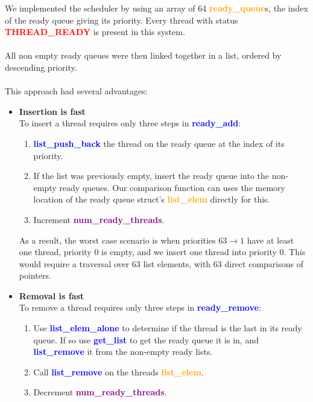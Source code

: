 \documentclass{report}
\newcommand{\bullpara}[2]{\item \textbf{#1} \ #2}
\newcommand{\fun}[1]{\textcolor{blue}{\textbf{#1}}}
\newcommand{\struct}[1]{\textcolor{orange}{\textbf{#1}}}
\newcommand{\var}[1]{\textcolor{purple}{\textbf{#1}}}
\newcommand{\const}[1]{\textcolor{red}{\textbf{#1}}}
\begin{document}
                We implemented the scheduler by using an array of 64 \struct{ready\_queue}s, the index of the ready queue giving its priority. Every thread with status \const{THREAD\_READY} is present in this system.
                \\
                \\ All non empty ready queues were then linked together in a list, ordered by descending priority.
                \\
                \\ This approach had several advantages:
                \begin{itemize}
                    \bullpara{Insertion is fast}{
                        \\ To insert a thread requires only three steps in \fun{ready\_add}:
                        \begin{enumerate}
                            \item \fun{list\_push\_back} the thread on the ready queue at the index of its priority.
                            \item If the list was previously empty, insert the ready queue into the non-empty ready queues. Our comparison function can uses the memory location of the ready queue struct's \struct{list\_elem} directly for this.
                            \item Increment \var{num\_ready\_threads}.
                        \end{enumerate}
                        As a result, the worst case scenario is when priorities $63 \to 1$ have at least one thread, priority $0$ is empty, and we insert one thread into priority $0$. This would require a traversal over $63$ list elements, with $63$ direct comparisons of pointers.
                    }
                    \bullpara{Removal is fast}{
                        \\ To remove a thread requires only three steps in \fun{ready\_remove}:
                        \begin{enumerate}
                            \item Use \fun{list\_elem\_alone} to determine if the thread is the last in its ready queue. If so use \fun{get\_list} to get the ready queue it is in, and \fun{list\_remove} it from the non-empty ready lists.
                            \item Call \fun{list\_remove} on the threads \struct{list\_elem}.
                            \item Decrement \var{num\_ready\_threads}.

\end{enumerate}}
\end{itemize}
\end{document}
